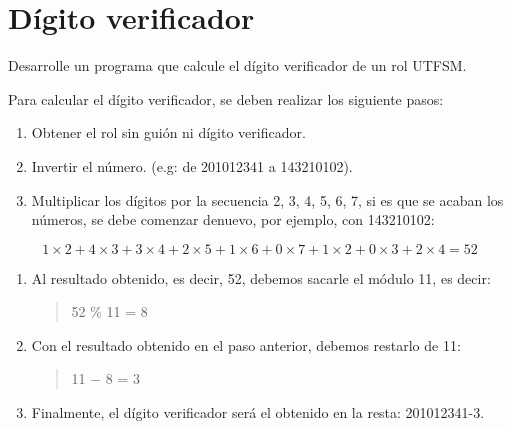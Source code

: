 \section{Dígito verificador}

Desarrolle un programa que calcule el dígito verificador de un rol
UTFSM.

Para calcular el dígito verificador, se deben realizar los siguiente
pasos:

\begin{enumerate}
\item
  Obtener el rol sin guión ni dígito verificador.
\item
  Invertir el número. (e.g: de 201012341 a 143210102).
\item
  Multiplicar los dígitos por la secuencia 2, 3, 4, 5, 6, 7, si es que
  se acaban los números, se debe comenzar denuevo, por ejemplo, con
  143210102:
\end{enumerate}

\[1\times2+ 4\times3+ 3\times4+ 2\times5+ 1\times6+ 0\times7+ 1\times2+ 0\times3+ 2\times4 = 52\]

\begin{enumerate}
\item
  Al resultado obtenido, es decir, 52, debemos sacarle el módulo 11, es
  decir:

  \begin{quote}
  52 \% 11 = 8
  \end{quote}
\item
  Con el resultado obtenido en el paso anterior, debemos restarlo de 11:

  \begin{quote}
  11 − 8 = 3
  \end{quote}
\item
  Finalmente, el dígito verificador será el obtenido en la resta:
  201012341-3.
\end{enumerate}
